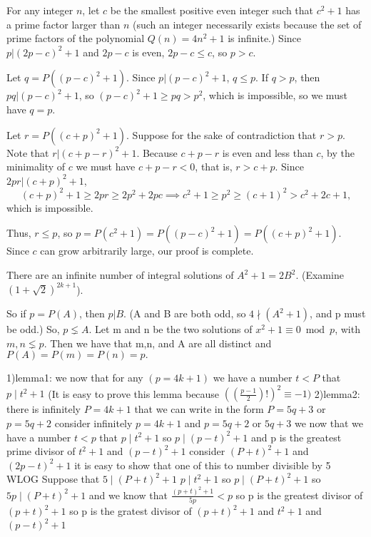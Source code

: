 \begin{solution}
	For any integer $n$, let $c$ be the smallest positive even integer such that $c^2 + 1$ has a prime factor larger than $n$ (such an integer necessarily exists because the set of prime factors of the polynomial $Q(n) = 4n^2 + 1$ is infinite.) Since $p | (2p - c)^2 + 1$ and $2p-c$ is even, $2p - c \leq c$, so $p > c$. 

Let $q = P((p-c)^2 + 1)$. Since $p | (p-c)^2 + 1$, $q \leq p$. If $q > p$, then $pq | (p-c)^2 + 1$, so $(p-c)^2 + 1 \geq pq > p^2$, which is impossible, so we must have $q = p$. 

Let $r = P((c+p)^2 + 1)$. Suppose for the sake of contradiction that $r > p$. Note that $r | (c+p-r)^2 + 1$. Because $c+p-r$ is even and less than $c$, by the minimality of $c$ we must have $c+p-r < 0$, that is, $r > c+p$. Since $2pr | (c+p)^2 + 1$, 
\[ (c+p)^2 + 1 \geq 2pr \geq 2p^2 + 2pc \implies c^2 + 1 \geq p^2 \geq (c+1)^2 > c^2 + 2c + 1, \]
which is impossible. 

Thus, $r \leq p$, so $p = P(c^2 + 1) = P((p-c)^2 + 1) = P((c+p)^2 + 1)$. Since $c$ can grow arbitrarily large, our proof is complete.
\end{solution}



\begin{solution}
	There are an infinite number of integral solutions of $A^2 + 1 = 2B^2$. (Examine $(1+\sqrt2)^{2k+1}$).

So if $p =P(A)$, then $p|B$.  (A and B are both odd, so $4\nmid (A^2 +1)$, and p must be odd.)  So, $p\lneq A$.  Let m and n be the two solutions of $x^2 +1\equiv 0 \bmod p$, with $m,n \lneq p$.  Then we have that m,n, and A are all distinct and $P(A)=P(m)=P(n) = p.$
\end{solution}



\begin{solution}
	1)lemma1: we now that for any $(p=4k+1)$ we have a number $t<P$ that $p\mid t^2+1$ (It is easy to prove this lemma because $((\frac{p-1}{2})!)^2\equiv -1)$
2)lemma2: there is infinitely $P=4k+1$ that we can write in the form $P=5q+3$ or$ p=5q+2$ 
consider infinitely  $ p=4k+1$ and $p=5q+2 $ or $ 5q+3$  we now that we have a number $ t<p$ that $p\mid t^2+1$ so $p\mid (p-t)^2+1$ and p is the greatest prime divisor of $t^2+1$ and $(p-t)^2+1$ 
consider $(P+t)^2+1$ and $(2p-t)^2+1$  it is easy to show that one of this to number divisible by 5 
WLOG Suppose that  $5\mid(P+t)^2+1$  
$p\mid t^2+1$ so $p\mid(P+t)^2+1$  so $5p\mid(P+t)^2+1$ and we know that $\frac{(p+t)^2+1}{5p}<p$ so p is the greatest divisor of $(p+t)^2+1$
so p is the gratest divisor of $(p+t)^2+1$ and  $t^2+1$ and $(p-t)^2+1$
\end{solution}



